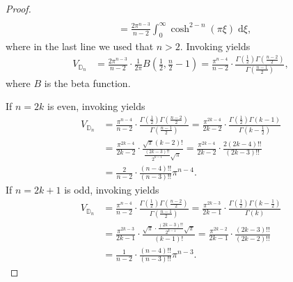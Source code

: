 \documentclass{amsart}
\newcommand{\DD}{\mathbb{D}}
\theoremstyle{definition}
\begin{document}
\begin{proof}
\begin{align*}
\\& = \frac{2\pi^{n-3}}{n-2}\int_0^\infty  \cosh^{2-n}(\pi\xi)\;\mathrm{d}\xi,
\end{align*}
where in the last line we used that $n>2$. Invoking \cite[Equation~3.512(2)]{MR2360010} yields
\begin{align}
V_{\DD_{n}}& = \frac{2\pi^{n-3}}{n-2} \cdot \frac{1}{2\pi} B\left(\frac{1}{2},\frac{n}{2}-1\right) = \frac{\pi^{n-4}}{n-2} \cdot \frac{\Gamma\left(\frac{1}{2}\right)\Gamma\left(\frac{n-2}{2}\right)}{\Gamma\left(\frac{n-1}{2}\right)},
\end{align}
where $B$ is the beta function.\medskip

If $n=2k$ is even, invoking \cite[Equation~1.2(15)]{batemanHTF1} yields  
\begin{equation*}
\begin{split}
V_{\DD_{n}} &= \frac{\pi^{n-4}}{n-2} \cdot\frac{\Gamma\left(\frac{1}{2}\right)\Gamma\left(\frac{n-2}{2}\right)}{\Gamma\left(\frac{n-1}{2}\right)} =\frac{\pi^{2k-4}}{2k-2} \cdot\frac{\Gamma\left(\frac{1}{2}\right)\Gamma\left(k-1\right)}{\Gamma\left(k-\frac{1}{2}\right)} 
\\& = \frac{\pi^{2k-4}}{2k-2} \cdot\frac{\sqrt{\pi}(k-2)!}{\frac{(2k-3)!!}{2^{k-1}}\sqrt{\pi}} = \frac{\pi^{2k-4}}{2k-2} \cdot\frac{2(2k-4)!!}{(2k-3)!!}
\\& = \frac{2}{n-2} \cdot \frac{(n-4)!!}{(n-3)!!}\pi^{n-4}.
\end{split}
\end{equation*}
If $n=2k+1$ is odd, invoking \cite[Equation~1.2(15)]{batemanHTF1} yields
\begin{equation*}
\begin{split}
V_{\DD_{n}} &= \frac{\pi^{n-4}}{n-2} \cdot\frac{\Gamma\left(\frac{1}{2}\right)\Gamma\left(\frac{n-2}{2}\right)}{\Gamma\left(\frac{n-1}{2}\right)} =\frac{\pi^{2k-3}}{2k-1} \cdot\frac{\Gamma\left(\frac{1}{2}\right)\Gamma\left(k-\frac{1}{2}\right)}{\Gamma\left(k\right)} 
\\& = \frac{\pi^{2k-3}}{2k-1} \cdot\frac{\sqrt{\pi}\cdot\frac{(2k-3)!!}{2^{k-1}}\sqrt{\pi}}{(k-1)!} = \frac{\pi^{2k-2}}{2k-1} \cdot\frac{(2k-3)!!}{(2k-2)!!}
\\& = \frac{1}{n-2} \cdot \frac{(n-4)!!}{(n-3)!!}\pi^{n-3}.
\end{split}
\end{equation*}

\end{proof}
\end{document}

